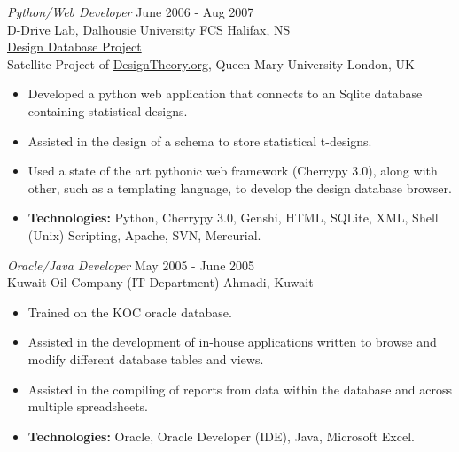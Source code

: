 \documentclass[line,margin]{res}
\begin{document}
\begin{resume}
    {\sl Python/Web Developer} \hfill June 2006 - Aug 2007 \\
    D-Drive Lab, Dalhousie University FCS \hfill Halifax, NS \\
    \href{http://batman.cs.dal.ca/~peter/designdb/}{Design Database Project}\\
    Satellite Project of \href{http://designtheory.org}{DesignTheory.org},
    Queen Mary University \hfill London, UK \smallskip
        \begin{itemize}  \itemsep -2pt %
    \item Developed a python web application that connects to an Sqlite
    database \\ containing statistical designs.
    \item Assisted in the design of a schema to store statistical t-designs.
    \item Used a state of the art pythonic web framework (Cherrypy 3.0),
    along with other, such as a templating language, to develop the design
    database browser.
    \item {\bf Technologies:} \hspace{1pt}
        Python, Cherrypy 3.0, Genshi, HTML, SQLite, XML, \newline
        \hspace*{72pt} Shell (Unix) Scripting, Apache, SVN, Mercurial.
        \end{itemize}

    {\sl Oracle/Java Developer} \hfill May 2005 - June 2005 \\
    Kuwait Oil Company  (IT Department) \hfill  Ahmadi, Kuwait
    \smallskip
        \begin{itemize}  \itemsep -2pt %
    \item Trained on the KOC oracle database.
    \item Assisted in the development of in-house applications written to
        browse and \\ modify different database tables and views.
    \item Assisted in the compiling of reports from data within the database
        and across multiple spreadsheets.
    \item {\bf Technologies:} \hspace{3pt}
        Oracle, Oracle Developer (IDE), Java, Microsoft Excel.
        \end{itemize}


\end{resume}
\end{document}
